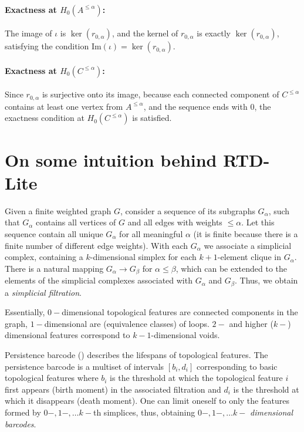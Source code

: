 \documentclass[twoside]{article}
\begin{document}
\paragraph{Exactness at \(H_0(A^{\leq\alpha})\):} The image of \(\iota\) is \(\ker(r_{0,\alpha})\), and the kernel of \(r_{0,\alpha}\) is exactly \(\ker(r_{0,\alpha})\), satisfying the condition \(\mathrm{Im}(\iota) = \ker(r_{0,\alpha})\).
\paragraph{Exactness at \(H_0(C^{\leq\alpha})\):} Since \(r_{0,\alpha}\) is surjective onto its image, because each connected component of \(C^{\leq\alpha}\) contains at least one vertex from \(A^{\leq\alpha}\), and the sequence ends with \(0\), the exactness condition at \(H_0(C^{\leq\alpha})\) is satisfied.

\section{On some intuition behind RTD-Lite}
\label{sec:rtdl_intuition}


Given a finite weighted graph $G$, consider a sequence of its subgraphs $G_\alpha$, such that $G_\alpha$ contains all vertices of $G$ and all edges with weights $\leq \alpha$. Let this sequence contain all unique $G_\alpha$ for all meaningful $\alpha$ (it is finite because there is a finite number of different edge weights). 
With each $G_\alpha$ we associate a simplicial complex, containing a $k$-dimensional simplex for each $k + 1$-element clique in $G_\alpha$. There is a natural mapping $G_\alpha \rightarrow G_\beta$ for $\alpha \leq \beta$, which can be extended to the elements of the simplicial complexes associated with $G_\alpha$ and $G_\beta$. Thus, we obtain a \textit{simplicial filtration}.


Essentially, $0-$dimensional topological features are  connected components in the graph, $1-$dimensional are (equivalence classes) of loops. $2-$ and higher ($k-$) dimensional features
correspond to $k - 1$-dimensional voids.

 Persistence barcode (\cite{barannikov2021canonical}) describes the lifespans of topological features. The persistence barcode is a multiset of intervals $[b_i, d_i]$ corresponding to basic topological features where $b_i$ is the threshold at which the topological feature $i$ first appears (birth moment) in the associated filtration and $d_i$ is the threshold at which it disappears (death moment). One can limit oneself to only the features formed by $0-, 1-, \ldots k-$th simplices, thus, obtaining $0-,1-, \ldots k-$ \textit{dimensional barcodes}.
\end{document}
